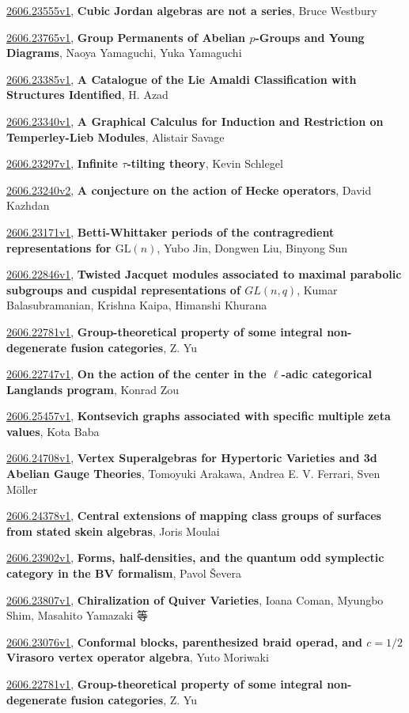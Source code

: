 \documentclass[9pt, a4paper]{article}
\theoremstyle{plain}
\theoremstyle{definition}
\theoremstyle{remark}
\newcommand{\arxiv}[3]{\href{https://arxiv.org/abs/#1}{#1}, \textbf{\textcolor{arxivblue}{#2}}, #3}
\begin{document}
\arxiv{2606.23555v1}{Cubic Jordan algebras are not a series}{Bruce Westbury}

\arxiv{2606.23765v1}{Group Permanents of Abelian $p$-Groups and Young Diagrams}{Naoya Yamaguchi, Yuka Yamaguchi}

\arxiv{2606.23385v1}{A Catalogue of the Lie Amaldi Classification with Structures Identified}{H. Azad}

\arxiv{2606.23340v1}{A Graphical Calculus for Induction and Restriction on Temperley-Lieb Modules}{Alistair Savage}

\arxiv{2606.23297v1}{Infinite $τ$-tilting theory}{Kevin Schlegel}

\arxiv{2606.23240v2}{A conjecture on the action of Hecke operators}{David Kazhdan}

\arxiv{2606.23171v1}{Betti-Whittaker periods of the contragredient representations for $\textrm{GL}(n)$}{Yubo Jin, Dongwen Liu, Binyong Sun}

\arxiv{2606.22846v1}{Twisted Jacquet modules associated to maximal parabolic subgroups and cuspidal representations of $GL(n, q)$}{Kumar Balasubramanian, Krishna Kaipa, Himanshi Khurana}

\arxiv{2606.22781v1}{Group-theoretical property of some integral non-degenerate fusion categories}{Z. Yu}

\arxiv{2606.22747v1}{On the action of the center in the $\ell$-adic categorical Langlands program}{Konrad Zou}

\arxiv{2606.25457v1}{Kontsevich graphs associated with specific multiple zeta values}{Kota Baba}

\arxiv{2606.24708v1}{Vertex Superalgebras for Hypertoric Varieties and 3d Abelian Gauge Theories}{Tomoyuki Arakawa, Andrea E. V. Ferrari, Sven Möller}

\arxiv{2606.24378v1}{Central extensions of mapping class groups of surfaces from stated skein algebras}{Joris Moulai}

\arxiv{2606.23902v1}{Forms, half-densities, and the quantum odd symplectic category in the BV formalism}{Pavol Ševera}

\arxiv{2606.23807v1}{Chiralization of Quiver Varieties}{Ioana Coman, Myungbo Shim, Masahito Yamazaki 等}

\arxiv{2606.23076v1}{Conformal blocks, parenthesized braid operad, and $c=1/2$ Virasoro vertex operator algebra}{Yuto Moriwaki}

\arxiv{2606.22781v1}{Group-theoretical property of some integral non-degenerate fusion categories}{Z. Yu}

\end{document}
